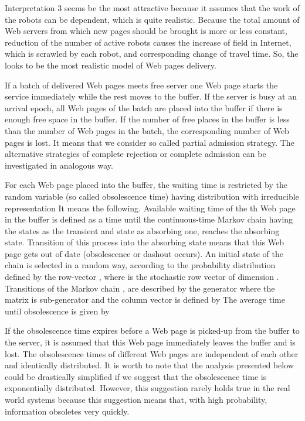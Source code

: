 \documentclass[11pt]{article}
\begin{document}
Interpretation 3 seems be the most attractive because it assumes
that the work of the robots can be dependent, which is quite
realistic. Because the total amount of Web servers from which new
pages should be brought is more or less constant, reduction of the
number of active robots causes the increase of field in Internet,
which is scrawled by each robot, and corresponding change of travel
time. So, the  looks to be the most realistic model of Web pages
delivery.

If a batch of delivered Web pages meets free server one
Web page starts the service immediately while the rest moves to the
buffer. If the server is busy at an arrival epoch, all Web pages of
the batch are placed into the buffer if there is enough free space
in the buffer. If the number of free places in the buffer is less
than the number of Web pages in the batch, the corresponding number
of Web pages is lost. It means that we consider so called partial
admission strategy. The alternative strategies of complete rejection
or complete admission can be investigated in analogous way.

For each Web page placed into the buffer, the waiting time is
 restricted by the random
variable (so called obsolescence time) having  distribution with
irreducible representation  It
means the following. Available waiting time of the th Web page in
the buffer is defined as a time   until the continuous-time Markov
chain  having the states  as the
transient and state  as absorbing one, reaches the absorbing
state. Transition of this process into the absorbing state means
that this Web page gets out of date (obsolescence or dashout
occurs). An initial state of the chain is selected in a random way,
according to the probability distribution defined by the row-vector
, where  is the
stochastic row vector of dimension . Transitions of the Markov
chain , are described by the generator 
 where the matrix  is sub-generator and the column
vector  is defined by 
 The average  time until obsolescence  is given by 

If the obsolescence time expires before a Web page is picked-up from
the buffer to the server, it is assumed  that this Web page
immediately leaves the buffer and is lost. The obsolescence times of
different Web pages are independent of each other and identically
distributed. It is worth to note that the analysis presented below
could be drastically simplified if we suggest that the obsolescence
time is exponentially distributed. However, this suggestion rarely
holds true in the real world systems because this suggestion means
that, with high probability, information obsoletes very quickly.
\end{document}
